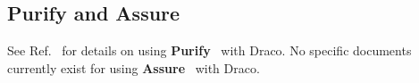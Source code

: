 \documentclass[10pt]{nmemo}
\newcommand{\draco}{{\normalfont\sffamily Draco}}
\newcommand{\doxygen}{{\normalfont\bfseries Doxygen}}
\begin{document}









\subsection{Purify and Assure}

See Ref.~\cite{draco-purify} for details on using
\textbf{Purify}~\cite{purify} with \draco.  No specific documents
currently exist for using \textbf{Assure}~\cite{assure} with \draco.
\end{document}
